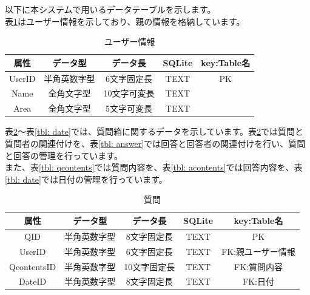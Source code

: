 \documentclass[a4j]{jarticle}
\begin{document}
以下に本システムで用いるデータテーブルを示します。\\
表\ref{tbl: user}はユーザー情報を示しており、親の情報を格納しています。\\

\begin{table}[H]
    \caption{ユーザー情報}
    \label{tbl: user}
    \begin{center}
        \begin{tabular}{|c|c|c|c|c|} \hline
            属性 & データ型 & データ長 & SQLite & key:Table名\\ \hline \hline
            UserID & 半角英数字型 & 6文字固定長 & TEXT & PK\\ \hline
            Name & 全角文字型 & 10文字可変長 & TEXT & \\ \hline
            Area & 全角文字型 & 5文字可変長 & TEXT & \\ \hline
        \end{tabular}
    \end{center}
\end{table}


表\ref{tbl: question}～表\ref{tbl: date}では、質問箱に関するデータを示しています。表\ref{tbl: question}では質問と質問者の関連付けを、表\ref{tbl: answer}では回答と回答者の関連付けを行い、質問と回答の管理を行っています。\\
また、表\ref{tbl: qcontents}では質問内容を、表\ref{tbl: acontents}では回答内容を、表\ref{tbl: date}では日付の管理を行っています。\\
\begin{table}[H]
    \caption{質問}
    \label{tbl: question}
    \begin{center}
        \begin{tabular}{|c|c|c|c|c|} \hline
            属性 & データ型 & データ長 & SQLite & key:Table名\\ \hline \hline
            QID & 半角英数字型 & 8文字固定長 & TEXT & PK\\ \hline
            UserID & 半角英数字型 & 6文字固定長 & TEXT & FK:親ユーザー情報\\ \hline
            QcontentsID & 半角英数字型 & 10文字固定長 & TEXT & FK:質問内容\\ \hline
            DateID & 半角英数字型 & 8文字固定長 & TEXT & FK:日付\\ \hline
        \end{tabular}
    \end{center}
\end{table}
\end{document}
